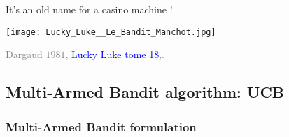 \begin{frameO}
    \begin{center}
        It's an old name for a casino machine \slotmachine{} !
    \end{center}

    \begin{center}
        \texttt{[image: Lucky\_Luke\_\_Le\_Bandit\_Manchot.jpg]}

        \begin{tiny}
            \textcolor{gray}{
                \textcopyright{} Dargaud $1981$,
                \href{https://www.dargaud.com/bd/LUCKY-LUKE/Lucky-Luke/Lucky-Luke-tome-18-Bandit-manchot-Le}{\textcolor{blue}{Lucky Luke tome 18}},.
            }
        \end{tiny}
    \end{center}
\end{frameO}



\subsection{Multi-Armed Bandit algorithm: UCB}

\subsubsection{Multi-Armed Bandit formulation}

